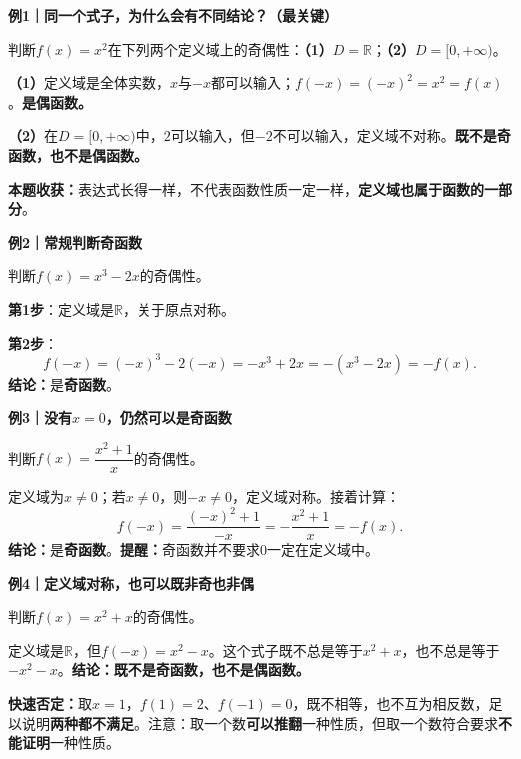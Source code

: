 \clearpage
\begin{examplebox}
\textbf{例1｜同一个式子，为什么会有不同结论？（最关键）}



判断$f(x)=x^2$在下列两个定义域上的奇偶性：\textbf{（1）}$D=\mathbb R$；\textbf{（2）}$D=[0,+\infty)$。

\textbf{（1）}定义域是全体实数，$x$与$-x$都可以输入；$f(-x)=(-x)^2=x^2=f(x)$。\textbf{是偶函数。}

\textbf{（2）}在$D=[0,+\infty)$中，$2$可以输入，但$-2$不可以输入，定义域不对称。\textbf{既不是奇函数，也不是偶函数。}

\textbf{本题收获：}表达式长得一样，不代表函数性质一定一样，\textbf{定义域也属于函数的一部分}。

\medskip
\end{examplebox}
\clearpage
\begin{examplebox}
\textbf{例2｜常规判断奇函数}



判断$f(x)=x^3-2x$的奇偶性。

\textbf{第1步}：定义域是$\mathbb R$，关于原点对称。

\textbf{第2步}：
\[
f(-x)=(-x)^3-2(-x)=-x^3+2x=-(x^3-2x)=-f(x).
\]
\textbf{结论：}是\textbf{奇函数}。

\medskip
\end{examplebox}
\clearpage
\begin{examplebox}
\textbf{例3｜没有$x=0$，仍然可以是奇函数}



判断$f(x)=\dfrac{x^2+1}{x}$的奇偶性。

定义域为$x\ne0$；若$x\ne0$，则$-x\ne0$，定义域对称。接着计算：
\[
f(-x)=\frac{(-x)^2+1}{-x}=-\frac{x^2+1}{x}=-f(x).
\]
\textbf{结论：}是\textbf{奇函数}。\textbf{提醒：}奇函数并不要求$0$一定在定义域中。

\medskip
\end{examplebox}
\clearpage
\begin{examplebox}
\textbf{例4｜定义域对称，也可以既非奇也非偶}



判断$f(x)=x^2+x$的奇偶性。

定义域是$\mathbb R$，但$f(-x)=x^2-x$。这个式子既不总是等于$x^2+x$，也不总是等于$-x^2-x$。\textbf{结论：既不是奇函数，也不是偶函数。}

\textbf{快速否定：}取$x=1$，$f(1)=2$、$f(-1)=0$，既不相等，也不互为相反数，足以说明\textbf{两种都不满足}。注意：取一个数\textbf{可以推翻}一种性质，但取一个数符合要求\textbf{不能证明}一种性质。

\medskip
\end{examplebox}
